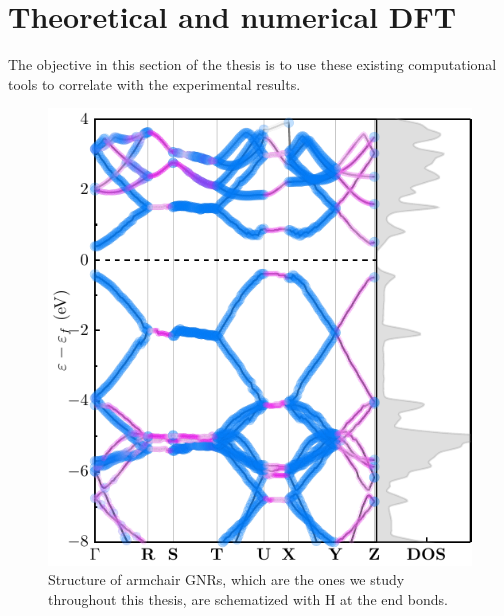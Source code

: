 \section{Theoretical and numerical DFT}
\vspace{-1cm}
The objective in this section of the thesis is to use these existing computational tools to correlate with the experimental results.



\begin{figure}[h!]
	\centering
	\includegraphics[width=0.80\linewidth]{FIGURES/Physical_Background/PLOT-GNRS007}
	\caption{Structure of armchair GNRs, which are the ones we study throughout this thesis, are schematized with H at the end bonds. }
	\label{fig:introfig32}
\end{figure}


